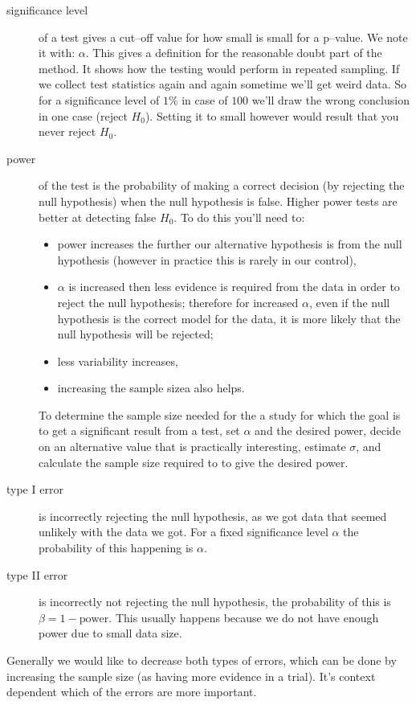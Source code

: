\begin{description}
  \item[significance level] of a test gives a cut--off value for how small is
  small for a p--value. We note it with: $\alpha$. This gives a definition for
  the reasonable doubt part of the method. It shows how the testing would
  perform in repeated sampling. If we collect test statistics again and again
  sometime we'll get weird data. So for a significance level of $1\%$ in case of
  $100$ we'll draw the wrong conclusion in one case (reject $H_0$). Setting it
  to small however would result that you never reject $H_0$.
  \item[power] of the test is the probability of making a correct decision (by
  rejecting the null hypothesis) when the null hypothesis is false. Higher power
  tests are better at detecting false $H_0$. To do this you'll need to:
  \begin{itemize}
  \item power increases the further our alternative hypothesis is from the null
  hypothesis (however in practice this is rarely in our control),
  \item $\alpha$ is increased then less evidence is required from the data in
  order to reject the null hypothesis; therefore for increased $\alpha$, even if
  the null hypothesis is the correct model for the data, it is more likely that the null
  hypothesis will be rejected;
  \item less variability increases,
  \item increasing the sample sizea also helps.
\end{itemize}
 To determine the sample size needed for the a study for which the goal is to
 get a significant result from a test, set $\alpha$ and the desired power,
 decide on an alternative value that is practically interesting, estimate
 $\sigma$, and calculate the sample size required to to give the desired power.
 \item[type I error] is incorrectly rejecting the null hypothesis, as we got
 data that seemed unlikely with the data we got. For a fixed significance level
 $\alpha$ the probability of this happening is $\alpha$.
 \item[type II error] is incorrectly not rejecting the null hypothesis, the
 probability of this is $\beta = 1 - \mbox{power}$. This usually happens because
 we do not have enough power due to small data size.
\end{description}

Generally we would like to decrease both types of errors, which can be done by
increasing the sample size (as having more evidence in a trial). It's context
dependent which of the errors are more important.

